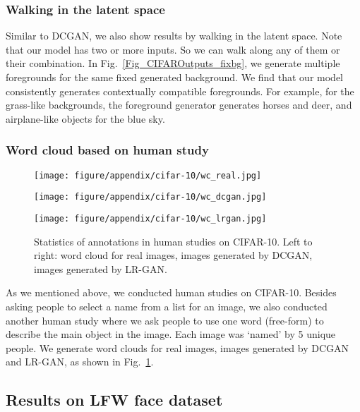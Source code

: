\documentclass{article} \usepackage{iclr2017_conference,times}
\begin{document}
\subsubsection{Walking in the latent space}
Similar to DCGAN, we also show results by walking in the latent space. Note that our model has two or more inputs. So we can walk along any of them or their combination. In Fig.~\ref{Fig_CIFAROutputs_fixbg}, we generate multiple foregrounds for the same fixed generated background. We find that our model consistently generates contextually compatible foregrounds. For example, for the grass-like backgrounds, the foreground generator generates horses and deer, and airplane-like objects for the blue sky. 

\subsubsection{Word cloud based on human study}
\label{Appendix_CIFAR_FIxedBG}
\begin{figure}[h]
  \begin{minipage}{0.33\textwidth}
    \center
\texttt{[image: figure/appendix/cifar-10/wc\_real.jpg]}
  \end{minipage}   
  \begin{minipage}{0.33\textwidth}
    \center
\texttt{[image: figure/appendix/cifar-10/wc\_dcgan.jpg]}
  \end{minipage}    
  \begin{minipage}{0.33\textwidth}
    \center
\texttt{[image: figure/appendix/cifar-10/wc\_lrgan.jpg]}
  \end{minipage}      
\caption{Statistics of annotations in human studies on CIFAR-10. Left to right: word cloud for real images, images generated by DCGAN, images generated by LR-GAN.}
\label{Fig_WordCloud}
\end{figure}
As we mentioned above, we conducted human studies on CIFAR-10. Besides asking people  to select a name from a list for an image, we also conducted another human study where we ask people to use one word (free-form) to describe the main object in the image. Each image was `named' by 5 unique people. We generate word clouds for real images, images generated by DCGAN and LR-GAN, as shown in Fig.~\ref{Fig_WordCloud}. 

\subsection{Results on LFW face dataset}
\end{document}
